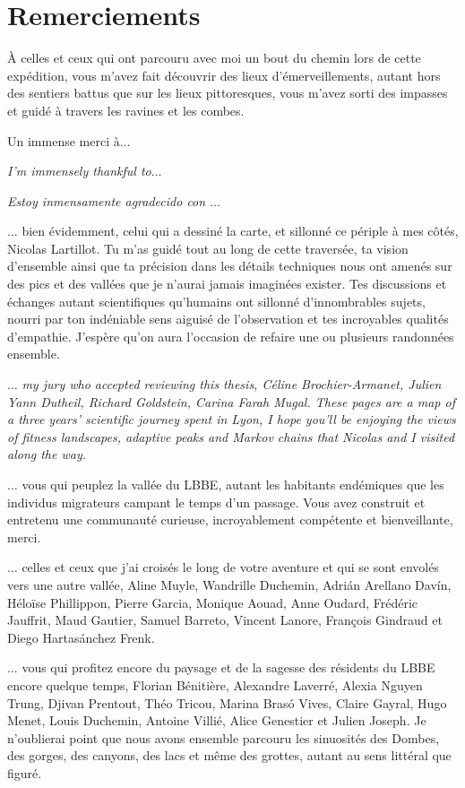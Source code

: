\thispagestyle{empty}
\section*{Remerciements}

À celles et ceux qui ont parcouru avec moi un bout du chemin lors de cette expédition, vous m’avez fait découvrir des lieux d’émerveillements, autant hors des sentiers battus que sur les lieux pittoresques, vous m’avez sorti des impasses et guidé à travers les ravines et les combes.

Un immense merci à$\hdots$

\textit{I’m immensely thankful to$\hdots$}

\textit{Estoy inmensamente agradecido con $\hdots$}

$\hdots$ bien évidemment, celui qui a dessiné la carte, et sillonné ce périple à mes côtés, Nicolas Lartillot.
Tu m’as guidé tout au long de cette traversée, ta vision d’ensemble ainsi que ta précision dans les détails techniques nous ont amenés sur des pics et des vallées que je n’aurai jamais imaginées exister.
Tes discussions et échanges autant scientifiques qu’humains ont sillonné d'innombrables sujets, nourri par ton indéniable sens aiguisé de l’observation et tes incroyables qualités d’empathie.
J’espère qu’on aura l’occasion de refaire une ou plusieurs randonnées ensemble.

$\hdots$ \textit{my jury who accepted reviewing this thesis, Céline Brochier-Armanet, Julien Yann Dutheil, Richard Goldstein, Carina Farah Mugal.
These pages are a map of a three years’ scientific journey spent in Lyon, I hope you’ll be enjoying the views of fitness landscapes, adaptive peaks and Markov chains that Nicolas and I visited along the way.}

$\hdots$ vous qui peuplez la vallée du LBBE, autant les habitants endémiques que les individus migrateurs campant le temps d’un passage.
Vous avez construit et entretenu une communauté curieuse, incroyablement compétente et bienveillante, merci.

$\hdots$ celles et ceux que j’ai croisés le long de votre aventure et qui se sont envolés vers une autre vallée, Aline Muyle, Wandrille Duchemin, Adrián Arellano Davín, Héloïse Phillippon, Pierre Garcia, Monique Aouad, Anne Oudard, Frédéric Jauffrit, Maud Gautier, Samuel Barreto, Vincent Lanore, François Gindraud et Diego Hartasánchez Frenk.

$\hdots$ vous qui profitez encore du paysage et de la sagesse des résidents du LBBE encore quelque temps, Florian Bénitière, Alexandre Laverré, Alexia Nguyen Trung, Djivan Prentout, Théo Tricou, Marina Brasó Vives, Claire Gayral, Hugo Menet, Louis Duchemin, Antoine Villié, Alice Genestier et Julien Joseph.
Je n’oublierai point que nous avons ensemble parcouru les sinuosités des Dombes, des gorges, des canyons, des lacs et même des grottes, autant au sens littéral que figuré.

